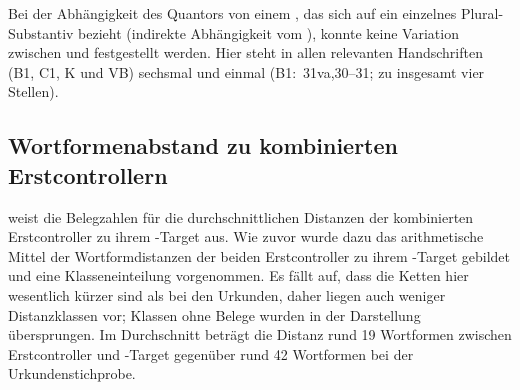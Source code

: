 Bei der Abhängigkeit des Quantors von einem , das sich
auf ein einzelnes Plural-Substantiv bezieht (indirekte Abhängigkeit vom
), konnte keine Variation zwischen  und 
festgestellt werden. Hier steht in allen relevanten Handschriften (B1, C1, K
und VB) sechsmal  und einmal  (B1:~31va,30--31; zu
insgesamt vier Stellen).


\subsection{Wortformenabstand zu kombinierten Erstcontrollern}

 weist die Belegzahlen für die durchschnittlichen
Distanzen der kombinierten Erstcontroller zu ihrem -Target aus. Wie
zuvor wurde dazu das arithmetische Mittel der Wortformdistanzen der beiden
Erstcontroller zu ihrem -Target gebildet und eine
Klasseneinteilung vorgenommen. Es fällt auf, dass die Ketten
hier wesentlich kürzer sind als bei den Urkunden, daher liegen auch weniger
Distanzklassen vor; Klassen ohne Belege wurden in der Darstellung übersprungen.
Im Durchschnitt beträgt die Distanz rund 19 Wortformen zwischen Erstcontroller
und -Target gegenüber rund 42 Wortformen bei der
Urkundenstichprobe.

